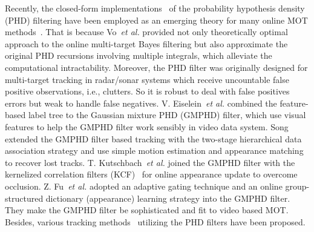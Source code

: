 \documentclass[journal]{IEEEtran}
\newcounter{ct}
\begin{document}
Recently, the closed-form implementations~\cite{smcphd,gmphd} of the probability hypothesis density (PHD) filtering have been employed as an emerging theory for many online MOT methods~\cite{gmphdn1tr,gmphdkcf,gmphd2012,fu1,eamtt,mtdf,prev1,prev2}. That is because
Vo~\textit{et al.}\cite{smcphd,gmphd} provided not only theoretically optimal approach to the online multi-target Bayes filtering but also approximate the original PHD recursions involving multiple integrals, which alleviate the computational intractability. Moreover, the PHD filter was originally designed for multi-target tracking in radar/sonar systems which receive uncountable false positive observations, i.e., clutters. So it is robust to deal with false positives errors but weak to handle false negatives.
V. Eiselein~\textit{et al.}\cite{gmphd2012} combined the feature-based label tree to the Gaussian mixture PHD (GMPHD) filter, which use visual features to help the GMPHD filter work sensibly in video data system. Song~\cite{prev1} extended the GMPHD filter based tracking with the two-stage hierarchical data association strategy and use simple motion estimation and appearance matching to recover lost tracks.
T. Kutschbach~\textit{et al.}\cite{gmphdkcf} joined the GMPHD filter with the kernelized correlation filters (KCF)~\cite{kcf} for online appearance update to overcome occlusion.
Z. Fu~\textit{et al.}\cite{fu1} adopted an adaptive gating technique and an online group-structured dictionary (appearance) learning strategy into the GMPHD filter. They make the GMPHD filter be sophisticated and fit to video based MOT.
Besides, various tracking methods~\cite{gmphdn1tr,eamtt,mtdf} utilizing the PHD filters have been proposed.
\end{document}
